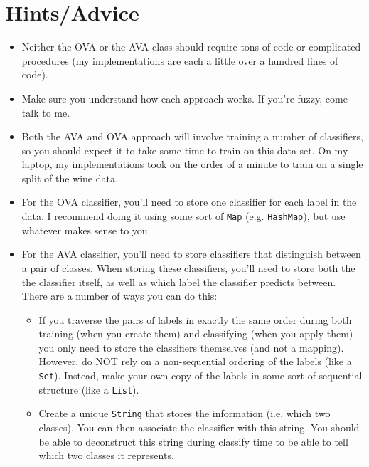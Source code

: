 \documentclass[11pt]{article}
\begin{document}
\section{Hints/Advice}

\begin{itemize}

\item Neither the OVA or the AVA class should require tons of code or complicated procedures (my implementations are each a little over a hundred lines of code).

\item Make sure you understand how each approach works.  If you're fuzzy, come talk to me.

\item Both the AVA and OVA approach will involve training a number of classifiers, so you should expect it to take some time to train on this data set.  On my laptop, my implementations took on the order of a minute to train on a single split of the wine data.

\item For the OVA classifier, you'll need to store one classifier for each label in the data. I recommend doing it using some sort of \texttt{Map} (e.g. \texttt{HashMap}), but use whatever makes sense to you.

\item For the AVA classifier, you'll need to store classifiers that distinguish between a pair of classes.  When storing these classifiers, you'll need to store both the the classifier itself, as well as which label the classifier predicts between.  There are a number of ways you can do this:

\begin{itemize}

\item If you traverse the pairs of labels in exactly the same order during both training (when you create them) and classifying (when you apply them) you only need to store the classifiers themselves (and not a mapping).  However, do NOT rely on a non-sequential ordering of the labels (like a \texttt{Set}).  Instead, make your own copy of the labels in some sort of sequential structure (like a \texttt{List}).

\item Create a unique \texttt{String} that stores the information (i.e. which two classes).  You can then associate the classifier with this string.  You should be able to deconstruct this string during classify time to be able to tell which two classes it represents.


\end{itemize}
\end{itemize}
\end{document}
